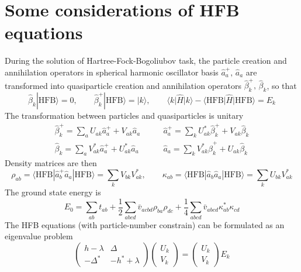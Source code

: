 \documentclass[10pt,a4paper]{article}
\begin{document}
\section{Some considerations of HFB equations}
During the solution of Hartree-Fock-Bogoliubov task, the particle creation and annihilation operators in spherical harmonic oscillator basis $\hat{a}_a^+,\,\hat{a}_a$ are transformed into quasiparticle creation and annihilation operators $\hat{\beta}_k^+,\,\hat{\beta}_k$, so that
\begin{equation}
\hat{\beta}_k|\mathrm{HFB}\rangle = 0, \qquad
\hat{\beta}_k^+|\mathrm{HFB}\rangle = |k\rangle, \qquad
\langle k|\hat{H}|k \rangle -
\langle\mathrm{HFB}|\hat{H}|\mathrm{HFB}\rangle = E_k
\end{equation}
The transformation between particles and quasiparticles is unitary
\begin{equation}
\begin{array}{ll}
\displaystyle\hat{\beta}_k^+ = \sum_a U_{ak}\hat{a}_a^+ + V_{ak}\hat{a}_a \qquad &
\displaystyle\hat{a}_a^+ = \sum_k U_{ak}^*\hat{\beta}_k^+ + V_{ak}\hat{\beta}_k \\
\displaystyle\hat{\beta}_k = \sum_a V_{ak}^*\hat{a}_a^+ + U_{ak}^*\hat{a}_a &
\displaystyle\hat{a}_a = \sum_k V_{ak}^*\hat{\beta}_k^+ + U_{ak}\hat{\beta}_k
\end{array}
\end{equation}
Density matrices are then
\begin{equation}
\rho_{ab} = \langle\mathrm{HFB}|\hat{a}_b^+\hat{a}_a|\mathrm{HFB}\rangle
= \sum_k V_{bk} V_{ak}^*, \qquad
\kappa_{ab} = \langle\mathrm{HFB}|\hat{a}_b\hat{a}_a|\mathrm{HFB}\rangle
= \sum_k U_{bk} V_{ak}^*
\end{equation}
The ground state energy is
\begin{equation}
E_0 = \sum_{ab} t_{ab} +
\frac{1}{2}\sum_{abcd} \bar{v}_{acbd}\rho_{ba}\rho_{dc} +
\frac{1}{4}\sum_{abcd} \bar{v}_{abcd}\kappa_{ab}^*\kappa_{cd}
\end{equation}
The HFB equations (with particle-number constrain) can be formulated as an eigenvalue problem
\begin{equation}
\label{HFB_eq}
\begin{pmatrix} h-\lambda & \Delta \\ -\Delta^* & -h^*+\lambda \end{pmatrix}
\begin{pmatrix} U_k \\ V_k \end{pmatrix} = \begin{pmatrix} U_k \\ V_k \end{pmatrix} E_k
\end{equation}
\end{document}
